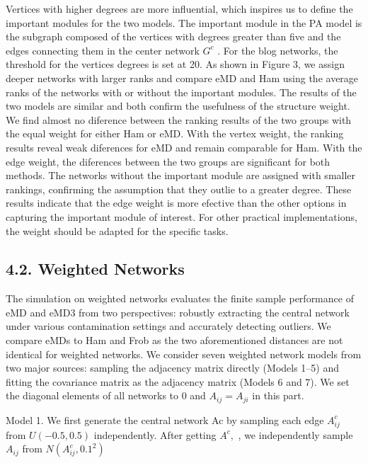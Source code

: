 \documentclass[
  10
]{article}
\begin{document}
Vertices with higher degrees are more influential, which inspires us to
define the important modules for the two models. The important module in
the PA model is the subgraph composed of the vertices with degrees
greater than five and the edges connecting them in the center network
\(G ^ { c }\) . For the blog networks, the threshold for the vertices
degrees is set at 20. As shown in Figure 3, we assign deeper networks
with larger ranks and compare eMD and Ham using the average ranks of the
networks with or without the important modules. The results of the two
models are similar and both confirm the usefulness of the structure
weight. We find almost no diference between the ranking results of the
two groups with the equal weight for either Ham or eMD. With the vertex
weight, the ranking results reveal weak diferences for eMD and remain
comparable for Ham. With the edge weight, the diferences between the two
groups are significant for both methods. The networks without the
important module are assigned with smaller rankings, confirming the
assumption that they outlie to a greater degree. These results indicate
that the edge weight is more efective than the other options in
capturing the important module of interest. For other practical
implementations, the weight should be adapted for the specific tasks.

\subsection{4.2. Weighted Networks}\label{weighted-networks}

The simulation on weighted networks evaluates the finite sample
performance of eMD and eMD3 from two perspectives: robustly extracting
the central network under various contamination settings and accurately
detecting outliers. We compare eMDs to Ham and Frob as the two
aforementioned distances are not identical for weighted networks. We
consider seven weighted network models from two major sources: sampling
the adjacency matrix directly (Models 1--5) and fitting the covariance
matrix as the adjacency matrix (Models 6 and 7). We set the diagonal
elements of all networks to 0 and \(A _ { i j } = A _ { j i }\) in this
part.

Model 1. We first generate the central network Ac by sampling each edge
\(A _ { i j } ^ { c }\) from \(U ( - 0 . 5 , 0 . 5 )\) independently.
After getting \(A ^ { c } ,\) , we independently sample \(A _ { i j }\)
from \(N ( A _ { i j } ^ { c } , 0 . 1 ^ { 2 } )\)
\end{document}
